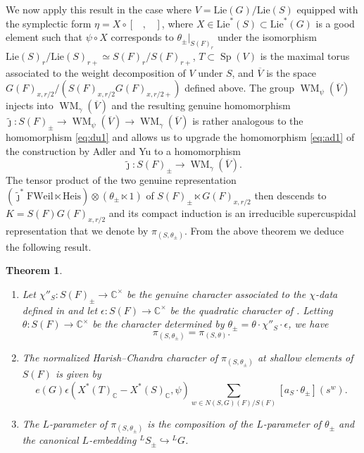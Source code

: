 \documentclass{article}
\def\C{\mathbb{C}}
\def\ol#1{\overline{#1}}
\DeclareMathOperator{\Sp}{Sp}
\newtheorem{thm}{Theorem}[subsection]
\theoremstyle{definition}
\numberwithin{equation}{subsection}
\renewcommand{\-}{\hyp{}}
\DeclareMathOperator{\WM}{WM}
\newcommand{\oV}{\ol{V}}
\begin{document}
We now apply this result in the case where $V=\mathrm{Lie}(G)/\mathrm{Lie}(S)$ equipped with the symplectic form $\eta = X \circ [ \phantom{X}, \phantom{X}]$, where $X \in \mathrm{Lie}^*(S) \subset \mathrm{Lie}^*(G)$ is a good element such that $\psi \circ X$ corresponds to $\theta_{\pm}|_{S(F)_{r}}$ under the isomorphism $\mathrm{Lie}(S)_r/\mathrm{Lie}(S)_{r+} \simeq S(F)_r/S(F)_{r+}$, $T \subset \Sp(V)$ is the maximal torus associated to the weight decomposition of $V$ under $S$, and $\ol{V}$ is the space $G(F)_{x,r/2}/(S(F)_{x,r/2}G(F)_{x,r/2+})$ defined above.
The group $\WM_\psi(\oV)$ injects into $\WM_\gamma(\oV)$ and the resulting genuine homomorphism $\tilde\jmath : S(F)_\pm \to \WM_\psi(\oV) \to \WM_\gamma(\oV)$ is rather analogous to the homomorphism \eqref{eq:du1} and allows us to upgrade the homomorphism \eqref{eq:ad1} of the construction by Adler and Yu to a homomorphism
\begin{equation} \label{eq:ad2}
	\tilde\jmath : S(F)_\pm \to \WM_\gamma(\oV).
\end{equation}
The tensor product of the two genuine representation $(\tilde\jmath^*\mathrm{FWeil} \ltimes \mathrm{Heis}) \otimes (\theta_\pm \ltimes 1)$ of $S(F)_{\pm} \ltimes G(F)_{x,r/2}$ then descends to $K=S(F)G(F)_{x,r/2}$ and its compact induction is an irreducible supercuspidal representation that we denote by $\pi_{(S,\theta_\pm)}$. From the above theorem we deduce the following result.

\begin{thm}
	\begin{enumerate}
		\item Let $\chi''_S : S(F)_\pm \to \C^\times$ be the genuine character associated to the $\chi$-data defined in \cite[\S4.2]{FKS23} and let $\epsilon : S(F) \to \C^\times$ be the quadratic character of \cite[Definition 5.5.8]{FKS23}. Letting $\theta : S(F) \to \C^\times$ be the character determined by $\theta_\pm = \theta \cdot \chi''_S \cdot \epsilon$, we have 
		\[ \pi_{(S,\theta_\pm)}=\pi_{(S,\theta)}. \]
		\item The normalized Harish--Chandra character of $\pi_{(S,\theta_\pm)}$ at shallow elements of $S(F)$ is given by 	\begin{equation*} \label{eq:char}
			e(G)\epsilon(X^*(T)_\C-X^*(S)_\C,\psi) \sum_{w \in N(S,G)(F)/S(F)} [a_S \cdot \theta_\pm](s^w).		
		\end{equation*}
		\item The $L$-parameter of $\pi_{(S,\theta_\pm)}$ is the composition of the $L$-parameter of $\theta_\pm$ and the canonical $L$-embedding $^LS_\pm \hookrightarrow {^LG}$.
	\end{enumerate}
\end{thm}
\end{document}
